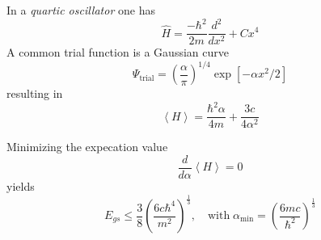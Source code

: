 \newpar{}

In a \textit{quartic oscillator} one has
\begin{equation*}
    \widehat{H}=\frac{-\hbar^{2}}{2m}\frac{d^{2}}{dx^{2}}+Cx^{4}
\end{equation*}
A common trial function is a Gaussian curve
\begin{equation*}
    \Psi_{\mathrm{trial}}={\left(\frac{\alpha}{\pi}\right)}^{1/4}\exp\left[-\alpha x^{2}/2\right]
\end{equation*}
resulting in
\begin{equation*}
    \left\langle H\right\rangle=\frac{\hbar^2\alpha}{4m}+\frac{3c}{4\alpha^2}
\end{equation*}

Minimizing the expecation value
\noindent\begin{equation*}
    \frac{d}{d \alpha} \left\langle H\right\rangle=0
\end{equation*}
yields 
\begin{equation*}
    E_{gs}\leq \frac{3}{8}{\left(\frac{6c\hbar^4}{m^2}\right)}^{\frac{1}{3}}, \quad\mathrm{with}\; \alpha_{\min} = {\left(\frac{6mc}{\hbar^2}\right)}^{\frac{1}{3}}
\end{equation*}
